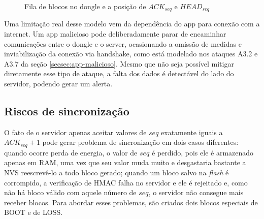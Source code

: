 \documentclass[
	12pt,
	article,			%
	oneside,
	a4paper,
	english,
	brazil				%
	]{abntex2}
\begin{document}
\begin{figure}[H]
	\centering
	\caption{Fila de blocos no dongle e a posição de $ACK_{seq}$ e $HEAD_{seq}$}
	\label{fig:fila-ack-head}
\end{figure}

Uma limitação real desse modelo vem da dependência do app para conexão com a internet. Um app malicioso pode deliberadamente parar de encaminhar comunicações entre o dongle e o server, ocasionando
a omissão de medidas e inviabilização da conexão via handshake, como está modelado nos ataques A3.2 e A3.7 da seção \ref{secsec:app-malicioso}. Mesmo que não seja possível mitigar diretamente esse
tipo de ataque, a falta dos dados é detectável do lado do servidor, podendo gerar um alerta.

\subsection{Riscos de sincronização}

O fato de o servidor apenas aceitar valores de $seq$ exatamente iguais a $ACK_{seq} + 1$ pode gerar problema de sincronização em dois casos diferentes: quando ocorre perda de energia, o valor de $seq$
é perdido, pois ele é armazenado apenas em RAM, uma vez que seu valor muda muito e desgastaria bastante a NVS reescrevê-lo a todo bloco gerado; quando um bloco salvo na \textit{flash} é corrompido,
a verificação de HMAC falha no servidor e ele é rejeitado e, como não há bloco válido com aquele número de $seq$, o servidor não consegue mais receber blocos. Para abordar esses problemas, são
criados dois blocos especiais de BOOT e de LOSS.
\end{document}
